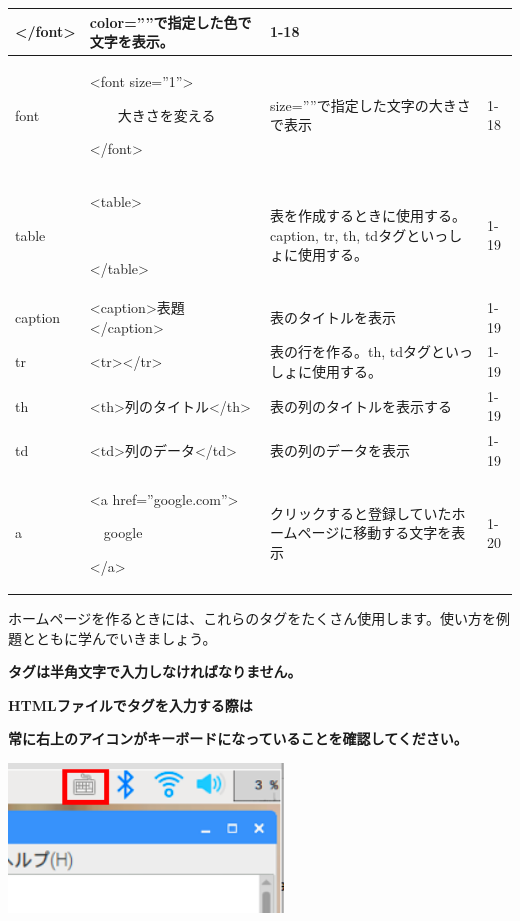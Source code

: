 \documentclass[a4paper,12pt]{jarticle}
\begin{document}
{\begin{center}
\begin{supertabular}{|m{2.171cm}|m{4.1060004cm}|m{7.8930006cm}|m{2.037cm}|}
{\textless}/font{\textgreater} &
color=””で指定した色で文字を表示。 &
1-18\\\hline
font &
{\textless}font size=”1”{\textgreater}

　　大きさを変える

{\textless}/font{\textgreater} &
size=””で指定した文字の大きさで表示 &
1-18\\\hline
table &
{\textless}table{\textgreater}

~

{\textless}/table{\textgreater} &
表を作成するときに使用する。caption, tr, th,
tdタグといっしょに使用する。 &
1-19\\\hline
caption &
{\textless}caption{\textgreater}表題{\textless}/caption{\textgreater} &
表のタイトルを表示 &
1-19\\\hline
tr &
{\textless}tr{\textgreater}{\textless}/tr{\textgreater} &
表の行を作る。th,
tdタグといっしょに使用する。 &
1-19\\\hline
th &
{\textless}th{\textgreater}列のタイトル{\textless}/th{\textgreater} &
表の列のタイトルを表示する &
1-19\\\hline
td &
{\textless}td{\textgreater}列のデータ{\textless}/td{\textgreater} &
表の列のデータを表示 &
1-19\\\hline
a &
{\textless}a href=”google.com”{\textgreater}

\ \ google

{\textless}/a{\textgreater} &
クリックすると登録していたホームページに移動する文字を表示
&
1-20\\\hline
\end{supertabular}
\end{center}
}

\bigskip
ホームページを作るときには、これらのタグをたくさん使用します。使い方を例題とともに学んでいきましょう。


\clearpage


{\centering\bfseries
タグは半角文字で入力しなければなりません。
\par}

{\centering\bfseries
HTMLファイルでタグを入力する際は
\par}

{\centering\bfseries
常に右上のアイコンがキーボードになっていることを確認してください。
\par}

\centering
\includegraphics[width=7.301cm,height=3.976cm]{textbook-img159.png}
\end{document}
